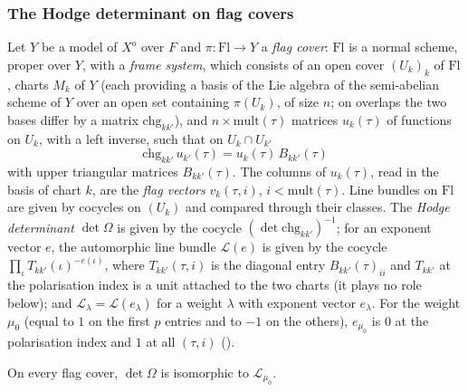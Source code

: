 \subsubsection*{The Hodge determinant on flag covers}
Let $Y$ be a model of $X^o$ over $F$ and $\pi\colon\mathrm{Fl}\to Y$ a \emph{flag cover}: $\mathrm{Fl}$ is a
normal scheme, proper over $Y$, with a \emph{frame system}, which consists of an open cover $(U_k)_k$ of
$\mathrm{Fl}$, charts $M_k$ of $Y$ (each providing a basis of the Lie algebra of the semi-abelian scheme of
$Y$ over an open set containing $\pi(U_k)$, of size $n$; on overlaps the two bases differ by a matrix
$\mathrm{chg}_{kk'}$), and $n\times\mathrm{mult}(\tau)$ matrices $u_k(\tau)$ of functions on $U_k$, with a
left inverse, such that on $U_k\cap U_{k'}$
\[
\mathrm{chg}_{kk'}\,u_{k'}(\tau)=u_k(\tau)\,B_{kk'}(\tau)
\]
with upper triangular matrices $B_{kk'}(\tau)$. The columns of $u_k(\tau)$, read in the basis of chart $k$,
are the \emph{flag vectors} $v_k(\tau,i)$, $i<\mathrm{mult}(\tau)$. Line bundles on $\mathrm{Fl}$ are given by
cocycles on $(U_k)$ and compared through their classes. The \emph{Hodge determinant}
$\det\Omega$ is given by the cocycle $(\det\mathrm{chg}_{kk'})^{-1}$; for an exponent vector $e$, the
automorphic line bundle $\mathcal L(e)$ is given by the cocycle $\prod_\iota T_{kk'}(\iota)^{-e(\iota)}$,
where $T_{kk'}(\tau,i)$ is the diagonal entry $B_{kk'}(\tau)_{ii}$ and $T_{kk'}$ at the polarisation index is
a unit attached to the two charts (it plays no role below); and $\mathcal L_\lambda=\mathcal L(e_\lambda)$ for a weight
$\lambda$ with exponent vector $e_\lambda$. For the weight $\mu_0$ (equal to $1$ on the first $p$ entries
and to $-1$ on the others), $e_{\mu_0}$ is $0$ at the polarisation index and $1$ at all $(\tau,i)$
().

\begin{proposition}\label{pf:covol:prop:lbiso}
On every flag cover, $\det\Omega$ is isomorphic to $\mathcal L_{\mu_0}$.
\end{proposition}

